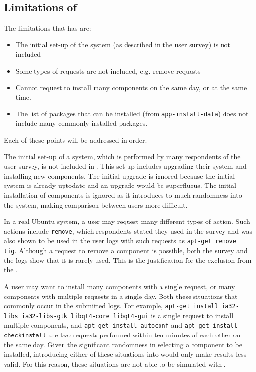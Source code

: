 \subsection{Limitations of \usermodel}
The limitations that \usermodel has are:
\begin{itemize}
  \item The initial set-up of the system (as described in the user survey) is not included
  \item Some types of requests are not included, e.g. remove requests
  \item Cannot request to install many components on the same day, or at the same time.
  \item The list of packages that can be installed (from \texttt{app-install-data}) does not include many commonly installed packages.
\end{itemize}
Each of these points will be addressed in order.

The initial set-up of a system, which is performed by many respondents of the user survey, is not included in \usermodel.
This set-up includes upgrading their system and installing new components.
The initial upgrade is ignored because the initial system is already uptodate and an upgrade would be superfluous.
The initial installation of components is ignored as it introduces to much randomness into the system, making comparison between users more difficult.

In a real Ubuntu system, a user may request many different types of action.
Such actions include \texttt{remove}, which respondents stated they used in the survey and was also shown to be used in the user logs with such requests as \texttt{apt-get remove tig}.
Although a request to remove a component is possible, both the survey and the logs show that it is rarely used.
This is the justification for the exclusion from the \usermodel.
 
A user may want to install many components with a single request, or many components with multiple requests in a single day.
Both these situations that commonly occur in the submitted logs.
For example, \texttt{apt-get install ia32-libs ia32-libs-gtk libqt4-core libqt4-gui} is a single request to install multiple components,
and  \texttt{apt-get install autoconf} and \texttt{apt-get install checkinstall} are two requests performed within ten minutes of each other on the same day.
Given the significant randomness in selecting a component to be installed, introducing either of these situations into \usermodel would only make results less valid.
For this reason, these situations are not able to be simulated with \usermodel.

